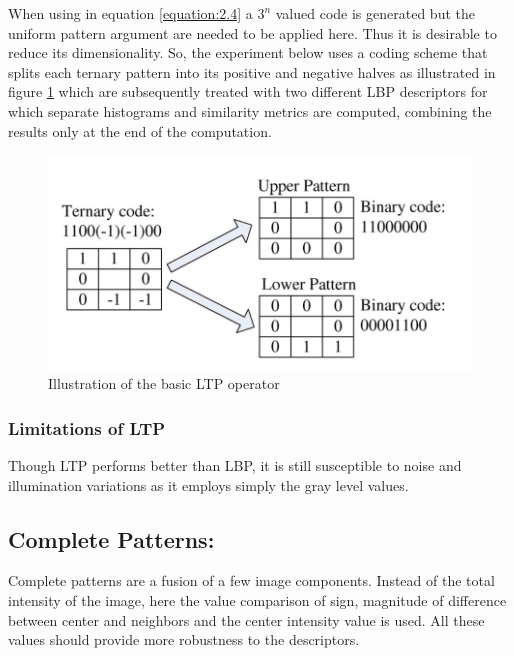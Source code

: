 \documentclass[12pt]{article}
\begin{document}
When using in equation \ref{equation:2.4} a $3^n$ valued code is generated but the uniform pattern argument are needed to be applied here. Thus it is desirable to reduce its dimensionality\cite{ltp01}. So, the experiment below uses a coding
scheme that splits each ternary pattern into its positive and negative halves as illustrated in figure \ref{figure:2.8} which are subsequently treated with two different LBP descriptors for which separate
histograms and similarity metrics are computed, combining the
results only at the end of the computation\cite{enhancedLTP1}.

\begin{figure}[h]
	\centering
	\includegraphics[width=\textwidth]{ltp_code2}
	\caption{Illustration of the basic LTP operator}
	\label{figure:2.8}
\end{figure}  
\subsubsection*{Limitations of LTP}
Though LTP performs better than LBP, it is still susceptible to noise and illumination variations as it employs simply the gray level values.

\subsection{Complete Patterns:}
Complete patterns are a fusion of a few image components.
Instead of the total intensity of the image, here the value comparison of sign, magnitude of difference between center and neighbors and the center intensity value is used. All these values should provide more robustness to the descriptors.
\end{document}
